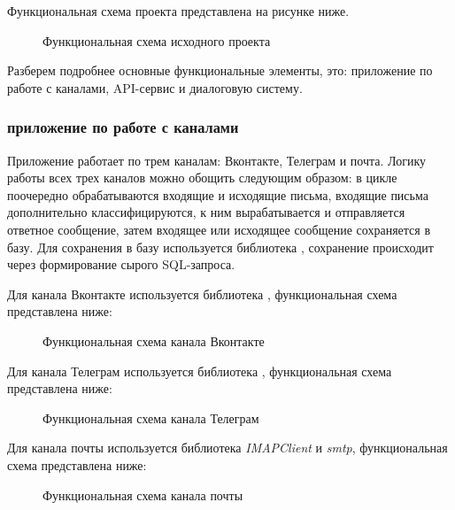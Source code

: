     Функциональная схема проекта представлена на рисунке ниже.
    \begin{figure}[!h]
        \centering
        \caption{Функциональная схема исходного проекта}
        \label{fig:func-schema-before}
    \end{figure}
    
    Разберем подробнее основные функциональные элементы, это: приложение по работе с каналами, API-сервис и диалоговую систему.
    
    \subsubsection{приложение по работе с каналами}
    Приложение работает по трем каналам: Вконтакте, Телеграм и почта. Логику работы всех трех каналов можно обощить
    следующим образом: в цикле поочередно обрабатываются входящие  и исходящие письма, входящие письма дополнительно
    классифицируются, к ним вырабатывается и отправляется ответное сообщение, затем входящее или исходящее сообщение
    сохраняется в базу. Для сохранения в базу используется библиотека \textit{}, сохранение происходит через формирование
    сырого SQL-запроса.
    
    Для канала Вконтакте используется библиотека \textit{}, функциональная схема представлена ниже:
    \begin{figure}[!h]
        \centering
        \caption{Функциональная схема канала Вконтакте}
        \label{fig:func-schema-vk-before}
    \end{figure}

    Для канала Телеграм используется библиотека \textit{}, функциональная схема представлена ниже:
    \begin{figure}[!h]
        \centering
        \caption{Функциональная схема канала Телеграм}
        \label{fig:func-schema-vk-before}
    \end{figure}
    
    Для канала почты используется библиотека \textit{IMAPClient} и \textit{smtp}, функциональная схема представлена ниже:
    \begin{figure}[!h]
        \centering
        \caption{Функциональная схема канала почты}
        \label{fig:func-schema-vk-before}
    \end{figure}

